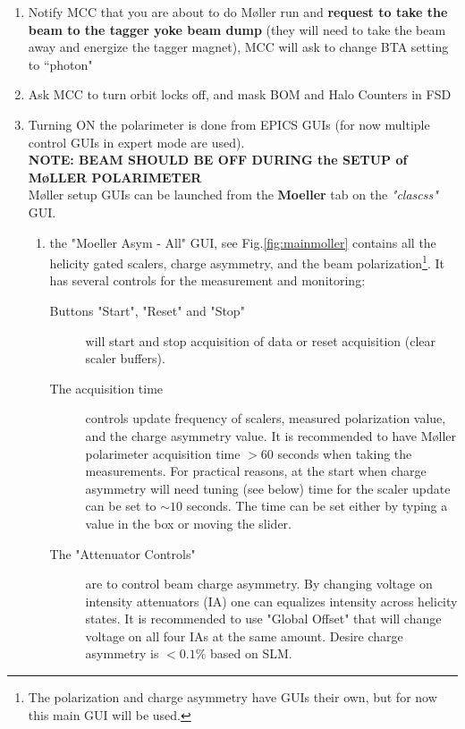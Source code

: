\begin{enumerate}
\item Notify MCC that you are about to do M{\o}ller run and \textbf{request
to take the beam to the tagger yoke beam dump} (they will need to take the beam
away and energize the tagger magnet), MCC will ask to change BTA setting to ``photon" 
\item Ask MCC to turn orbit locks off, and mask BOM and Halo Counters in FSD 
\item Turning ON the polarimeter is done from EPICS GUIs (for now multiple control GUIs in expert mode are used). \\
{\bf NOTE: BEAM SHOULD BE OFF DURING the SETUP of M{\o}LLER POLARIMETER}\\
M{\o}ller setup GUIs can be launched from the \textbf{Moeller} tab on the \emph{"clascss"} GUI. 

\begin{enumerate}
\item the "Moeller Asym - All" GUI, see Fig.\ref{fig:mainmoller} contains all the helicity gated scalers, charge asymmetry, and the beam polarization\footnote{The polarization and charge asymmetry have GUIs their own, but for now this main GUI will be used.}. It has several controls for the measurement and monitoring: 
\begin{description}
\item[Buttons "Start", "Reset" and "Stop"] will start and stop acquisition of data or reset acquisition (clear scaler buffers). 
\item[The acquisition time] controls update frequency of scalers, measured polarization value, and the charge asymmetry value. It is recommended to have M{\o}ller polarimeter acquisition time $>60$ seconds when taking the measurements. For practical reasons, at the start when charge asymmetry will need tuning (see below) time for the scaler update can be set to $\sim 10$ seconds. The time can be set either by typing a value in the box or moving the slider. 
\item[The "Attenuator Controls"] are to control beam charge asymmetry. By changing voltage on intensity attenuators (IA) one can equalizes intensity across helicity states. It is recommended to use "Global Offset" that will change voltage on all four IAs at the same amount. Desire charge asymmetry is $<0.1\%$ based on SLM. 
\end{description}


\end{enumerate}
\end{enumerate}

